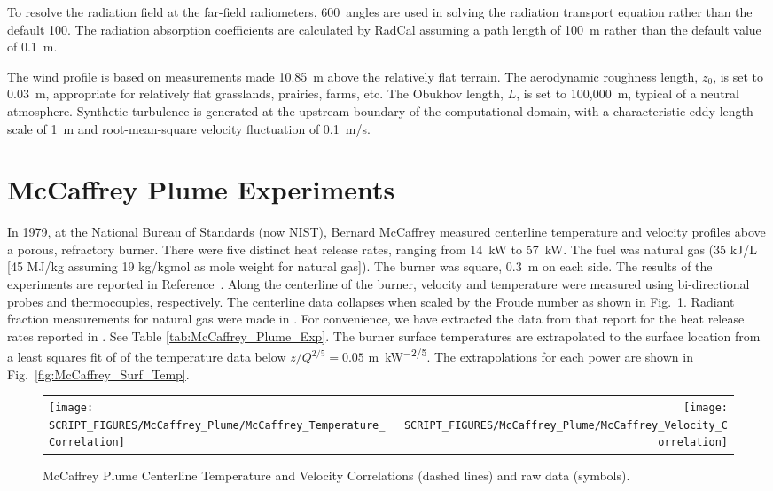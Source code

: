 To resolve the radiation field at the far-field radiometers, 600~angles are used in solving the radiation transport equation rather than the default 100. The radiation absorption coefficients are calculated by RadCal assuming a path length of 100~m rather than the default value of 0.1~m. 

The wind profile is based on measurements made 10.85~m above the relatively flat terrain. The aerodynamic roughness length, $z_0$, is set to 0.03~m, appropriate for relatively flat grasslands, prairies, farms, etc. The Obukhov length, $L$, is set to 100,000~m, typical of a neutral atmosphere. Synthetic turbulence is generated at the upstream boundary of the computational domain, with a characteristic eddy length scale of 1~m and root-mean-square velocity fluctuation of 0.1~m/s.




\section{McCaffrey Plume Experiments}
\label{McCaffrey_Plume_Description}

In 1979, at the National Bureau of Standards (now NIST), Bernard McCaffrey measured centerline temperature and velocity profiles above a porous, refractory burner. There were five distinct heat release rates, ranging from 14~kW to 57~kW. The fuel was natural gas (35 kJ/L [45 MJ/kg assuming 19 kg/kgmol as mole weight for natural gas]). The burner was square, 0.3~m on each side. The results of the experiments are reported in Reference~\cite{McCaffrey:NBSIR_79-1910}. Along the centerline of the burner, velocity and temperature were measured using bi-directional probes and thermocouples, respectively.  The centerline data collapses when scaled by the Froude number as shown in Fig.~\ref{fig:McCaffrey_Correlations}. Radiant fraction measurements for natural gas were made in \cite{McCaffrey:1981}.  For convenience, we have extracted the data from that report for the heat release rates reported in \cite{McCaffrey:NBSIR_79-1910}.  See Table \ref{tab:McCaffrey_Plume_Exp}.  The burner surface temperatures are extrapolated to the surface location from a least squares fit of of the temperature data below $z/Q^{2/5} = 0.05$ \si{m.kW^{-2/5}}.  The extrapolations for each power are shown in Fig.~\ref{fig:McCaffrey_Surf_Temp}.

\begin{figure}[!ht]
\begin{tabular*}{\textwidth}{l@{\extracolsep{\fill}}r}
\texttt{[image: SCRIPT\_FIGURES/McCaffrey\_Plume/McCaffrey\_Temperature\_Correlation]} &
\texttt{[image: SCRIPT\_FIGURES/McCaffrey\_Plume/McCaffrey\_Velocity\_Correlation]} \\
\end{tabular*}
\caption[McCaffrey Plume Centerline Temperature and Velocity Correlations]
{McCaffrey Plume Centerline Temperature and Velocity Correlations (dashed lines) and raw data (symbols).}
\label{fig:McCaffrey_Correlations}
\end{figure}

